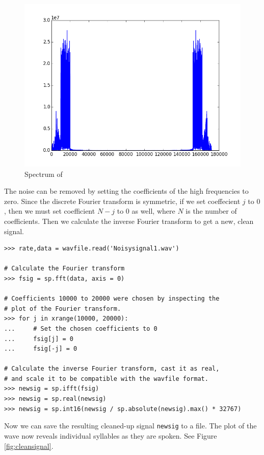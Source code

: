 \begin{figure}
\centering
\includegraphics[width=\textwidth]{noisyspec}
\caption{Spectrum of }
\label{fig:noisyspec}
\end{figure}

The noise can be removed by setting the coefficients of the high frequencies to zero.
Since the discrete Fourier transform is symmetric, if we set coeffecient $j$ to $0$, then we must set coefficient $N - j$ to $0$ as well, where $N$ is the number of coefficients.
Then we calculate the inverse Fourier transform to get a new, clean signal.

\begin{lstlisting}
>>> rate,data = wavfile.read('Noisysignal1.wav')

# Calculate the Fourier transform
>>> fsig = sp.fft(data, axis = 0)

# Coefficients 10000 to 20000 were chosen by inspecting the
# plot of the Fourier transform.
>>> for j in xrange(10000, 20000):
...     # Set the chosen coefficients to 0
...     fsig[j] = 0
...     fsig[-j] = 0

# Calculate the inverse Fourier transform, cast it as real,
# and scale it to be compatible with the wavfile format.
>>> newsig = sp.ifft(fsig)
>>> newsig = sp.real(newsig)
>>> newsig = sp.int16(newsig / sp.absolute(newsig).max() * 32767)
\end{lstlisting}

Now we can save the resulting cleaned-up signal \texttt{newsig} to a  file.
The plot of the wave now reveals individual syllables as they are spoken.
See Figure \ref{fig:cleansignal}.

